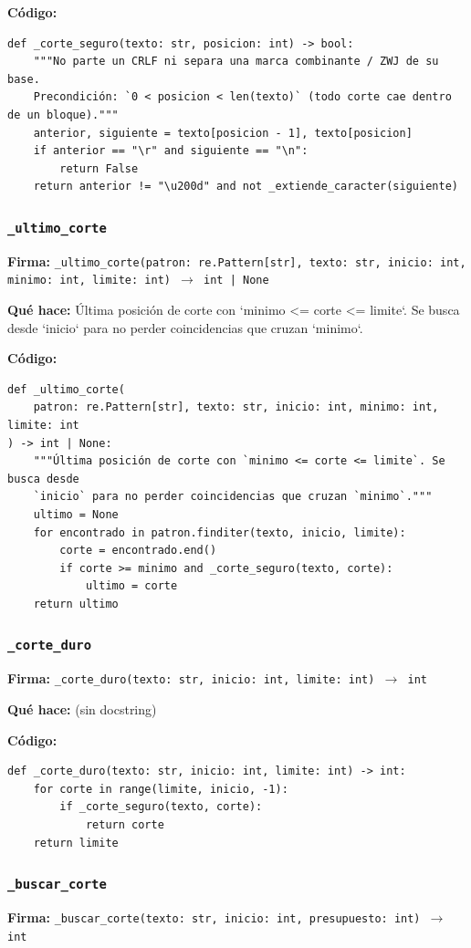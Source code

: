 \documentclass[11pt,a4paper]{article}
\begin{document}
\textbf{Código:}
\begin{lstlisting}
def _corte_seguro(texto: str, posicion: int) -> bool:
    """No parte un CRLF ni separa una marca combinante / ZWJ de su base.
    Precondición: `0 < posicion < len(texto)` (todo corte cae dentro de un bloque)."""
    anterior, siguiente = texto[posicion - 1], texto[posicion]
    if anterior == "\r" and siguiente == "\n":
        return False
    return anterior != "\u200d" and not _extiende_caracter(siguiente)
\end{lstlisting}

\subsubsection*{\texttt{\_ultimo\_corte}}
\textbf{Firma:} \texttt{\_ultimo\_corte(patron: re.Pattern[str], texto: str, inicio: int, minimo: int, limite: int) $\rightarrow$ int | None}

\textbf{Qué hace:} Última posición de corte con `minimo <= corte <= limite`. Se busca desde
`inicio` para no perder coincidencias que cruzan `minimo`.

\textbf{Código:}
\begin{lstlisting}
def _ultimo_corte(
    patron: re.Pattern[str], texto: str, inicio: int, minimo: int, limite: int
) -> int | None:
    """Última posición de corte con `minimo <= corte <= limite`. Se busca desde
    `inicio` para no perder coincidencias que cruzan `minimo`."""
    ultimo = None
    for encontrado in patron.finditer(texto, inicio, limite):
        corte = encontrado.end()
        if corte >= minimo and _corte_seguro(texto, corte):
            ultimo = corte
    return ultimo
\end{lstlisting}

\subsubsection*{\texttt{\_corte\_duro}}
\textbf{Firma:} \texttt{\_corte\_duro(texto: str, inicio: int, limite: int) $\rightarrow$ int}

\textbf{Qué hace:} (sin docstring)

\textbf{Código:}
\begin{lstlisting}
def _corte_duro(texto: str, inicio: int, limite: int) -> int:
    for corte in range(limite, inicio, -1):
        if _corte_seguro(texto, corte):
            return corte
    return limite
\end{lstlisting}

\subsubsection*{\texttt{\_buscar\_corte}}
\textbf{Firma:} \texttt{\_buscar\_corte(texto: str, inicio: int, presupuesto: int) $\rightarrow$ int}
\end{document}

